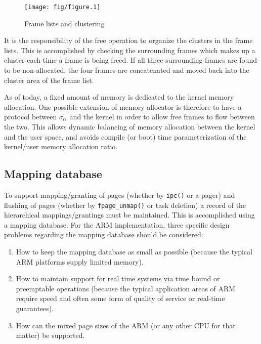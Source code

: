 \documentclass[a4paper,10pt,twoside]{article}
\newcommand{\sigmaz}{\mbox{$\sigma_0$}}
\newcommand{\Fu}[2][]{\texttt{#2(#1)}}    %
\begin{document}
\begin{figure}[tbp]
  \begin{center}
    \texttt{[image: fig/figure.1]}
    \caption{Frame lists and clustering}
    \label{fig:clustering}
  \end{center}
\end{figure}

It is the responsibility of the free operation to organize the
clusters in the frame lists.  This is accomplished by checking the
surrounding frames which makes up a cluster each time a frame is being
freed.  If all three surrounding frames are found to be non-allocated,
the four frames are concatenated and moved back into the cluster area
of the frame list.

As of today, a fixed amount of memory is dedicated to the kernel
memory allocation.  One possible extension of memory allocator is
therefore to have a protocol between \sigmaz\ and the kernel in order
to allow free frames to flow between the two.  This allows dynamic
balancing of memory allocation between the kernel and the user space,
and avoids compile (or boot) time parameterization of the kernel/user
memory allocation ratio.


\subsection{Mapping database}
\label{sec:mapping-db}

To support mapping/granting of pages (whether by \Fu{ipc} or a pager)
and flushing of pages (whether by \Fu{fpage\_unmap} or task deletion)
a record of the hierarchical mappings/grantings must be maintained.
This is accomplished using a mapping database.  For the ARM
implementation, three specific design problems regarding the mapping
database should be considered:

\begin{enumerate}
\item How to keep the mapping database as small as possible (because
  the typical ARM platforms supply limited memory).
\item How to maintain support for real time systems via time bound or
  preemptable operations (because the typical application areas of ARM
  require speed and often some form of quality of service or real-time
  guarantees).
\item How can the mixed page sizes of the ARM (or any other CPU for
  that matter) be supported.
\end{enumerate}
\end{document}
